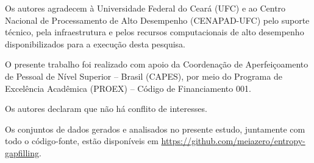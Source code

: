 \documentclass{sbc2019}%
\begin{document}
\begin{acknowledgements}
  Os autores agradecem à Universidade Federal do Ceará (UFC) e ao Centro Nacional de Processamento de Alto Desempenho (CENAPAD-UFC) pelo suporte técnico, pela infraestrutura e pelos recursos computacionais de alto desempenho disponibilizados para a execução desta pesquisa.
\end{acknowledgements}

\begin{funding}
  O presente trabalho foi realizado com apoio da Coordenação de Aperfeiçoamento de Pessoal de Nível Superior – Brasil (CAPES), por meio do Programa de Excelência Acadêmica (PROEX) – Código de Financiamento 001.
\end{funding}


\begin{interests}
  Os autores declaram que não há conflito de interesses.
\end{interests}

\begin{materials}
  Os conjuntos de dados gerados e analisados no presente estudo, juntamente com todo o código-fonte, estão disponíveis em \url{https://github.com/meiazero/entropy-gapfilling}.
\end{materials}

\balance


\end{document}
